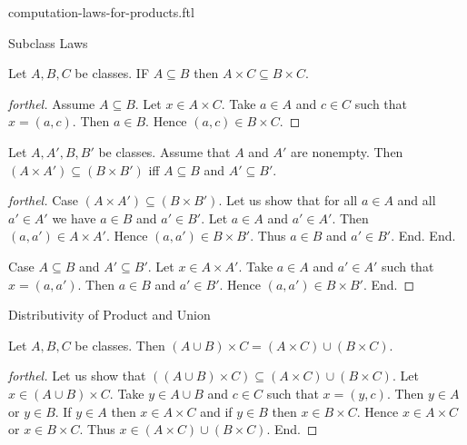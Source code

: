 \documentclass{naproche-library}
\begin{document}
\begin{smodule}[title=Computation Laws for Cartesian Products]{computation-laws-for-products.ftl}

\begin{sfragment}{Subclass Laws}
  \begin{proposition}[forthel,id=FOUNDATIONS_05_5719644021194752]
    Let $A, B, C$ be classes.
    IF $A \subseteq B$ then $A \times C \subseteq B \times C$.
  \end{proposition}
  \begin{proof}[forthel]
    Assume $A \subseteq B$.
    Let $x \in A \times C$.
    Take $a \in A$ and $c \in C$ such that $x = (a, c)$.
    Then $a \in B$.
    Hence $(a, c) \in B \times C$.
  \end{proof}

  \begin{proposition}[forthel,id=FOUNDATIONS_05_4888282951319552]
    Let $A, A', B, B'$ be classes.
    Assume that $A$ and $A'$ are nonempty.
    Then $(A \times A') \subseteq (B \times B')$ iff $A \subseteq B$ and $A' \subseteq B'$.
  \end{proposition}
  \begin{proof}[forthel]
    Case $(A \times A') \subseteq (B \times B')$.
      Let us show that for all $a \in A$ and all $a' \in A'$ we have $a \in B$ and $a' \in B'$.
        Let $a \in A$ and $a' \in A'$.
        Then $(a, a') \in A \times A'$.
        Hence $(a, a') \in B \times B'$.
        Thus $a \in B$ and $a' \in B'$.
      End.
    End.

    Case $A \subseteq B$ and $A' \subseteq B'$.
      Let $x \in A \times A'$.
      Take $a \in A$ and $a' \in A'$ such that $x = (a, a')$.
      Then $a \in B$ and $a' \in B'$.
      Hence $(a, a') \in B \times B'$.
    End.
  \end{proof}
\end{sfragment}

\begin{sfragment}{Distributivity of Product and Union}
  \begin{proposition}[forthel,id=FOUNDATIONS_05_8849658323402752]
    Let $A, B, C$ be classes.
    Then $(A \cup B) \times C = (A \times C) \cup (B \times C)$.
  \end{proposition}
  \begin{proof}[forthel]
    Let us show that $((A \cup B) \times C) \subseteq (A \times C) \cup (B \times C).$ %
      Let $x \in (A \cup B) \times C$.
      Take $y \in A \cup B$ and $c \in C$ such that $x = (y, c)$.
      Then $y \in A$ or $y \in B$.
      If $y \in A$ then $x \in A \times C$ and if $y \in B$ then $x \in B \times C$.
      Hence $x \in A \times C$ or $x \in B \times C$.
      Thus $x \in (A \times C) \cup (B \times C)$.
    End.


\end{proof}
\end{sfragment}
\end{smodule}
\end{document}
